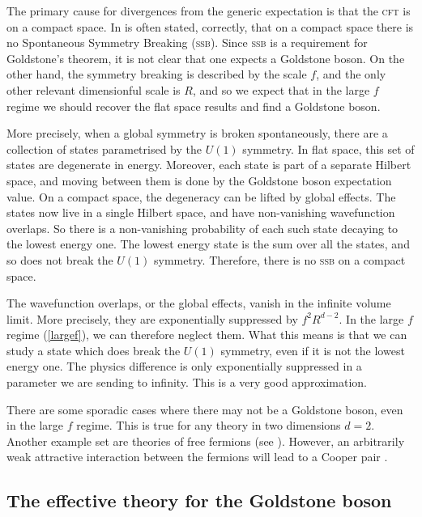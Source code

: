 \documentclass[11pt]{article}
\numberwithin{equation}{section}
\begin{document}
The primary cause for divergences from the generic expectation is that the \textsc{cft} is on a compact space. In is often stated, correctly, that on a compact space there is no Spontaneous Symmetry Breaking (\textsc{ssb}). Since \textsc{ssb} is a requirement for Goldstone's theorem, it is not clear that one expects a Goldstone boson. On the other hand, the symmetry breaking is described by the scale $f$, and the only other relevant dimensionful scale is $R$, and so we expect that in the large $f$ regime we should recover the flat space results and find a Goldstone boson. 

More precisely, when a global symmetry is broken spontaneously, there are a collection of states parametrised by the $U(1)$ symmetry. In flat space, this set of states are degenerate in energy. Moreover, each state is part of a separate Hilbert space, and moving between them is done by the Goldstone boson expectation value. On a compact space, the degeneracy can be lifted by global effects. The states now live in a single Hilbert space, and have non-vanishing wavefunction overlaps. So there is a non-vanishing probability of each such state decaying to the lowest energy one. The lowest energy state is the sum over all the states, and so does not break the $U(1)$ symmetry. Therefore, there is no \textsc{ssb} on a compact space. 

The wavefunction overlaps, or the global effects, vanish in the infinite volume limit. More precisely, they are exponentially suppressed by $f^2 R^{d-2}$. In the large $f$ regime (\ref{largef}), we can therefore neglect them. What this means is that we can study a state which does break the $U(1)$ symmetry, even if it is not the lowest energy one. The physics difference is only exponentially suppressed in a parameter we are sending to infinity. This is a very good approximation. 

There are some sporadic cases where there may not be a Goldstone boson, even in the large $f$ regime. This is true for any theory in two dimensions $d=2$. Another example set are theories of free fermions (see \cite{Komargodski:2021zzy}). However, an arbitrarily weak attractive interaction between the fermions will lead to a Cooper pair \cite{Cooper:1956zz}.

\subsection{The effective theory for the Goldstone boson }
\label{sec:effgb}
\end{document}
